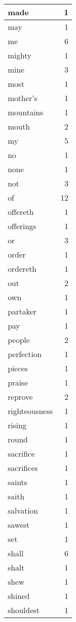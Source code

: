 \begin{center}
\begin{longtable}{l|r}
made & 1 \\ \hline
may & 1 \\ \hline
me & 6 \\ \hline
mighty & 1 \\ \hline
mine & 3 \\ \hline
most & 1 \\ \hline
mother's & 1 \\ \hline
mountains & 1 \\ \hline
mouth & 2 \\ \hline
my & 5 \\ \hline
no & 1 \\ \hline
none & 1 \\ \hline
not & 3 \\ \hline
of & 12 \\ \hline
offereth & 1 \\ \hline
offerings & 1 \\ \hline
or & 3 \\ \hline
order & 1 \\ \hline
ordereth & 1 \\ \hline
out & 2 \\ \hline
own & 1 \\ \hline
partaker & 1 \\ \hline
pay & 1 \\ \hline
people & 2 \\ \hline
perfection & 1 \\ \hline
pieces & 1 \\ \hline
praise & 1 \\ \hline
reprove & 2 \\ \hline
righteousness & 1 \\ \hline
rising & 1 \\ \hline
round & 1 \\ \hline
sacrifice & 1 \\ \hline
sacrifices & 1 \\ \hline
saints & 1 \\ \hline
saith & 1 \\ \hline
salvation & 1 \\ \hline
sawest & 1 \\ \hline
set & 1 \\ \hline
shall & 6 \\ \hline
shalt & 1 \\ \hline
shew & 1 \\ \hline
shined & 1 \\ \hline
shouldest & 1 \\ \hline

\end{longtable}
\end{center}

